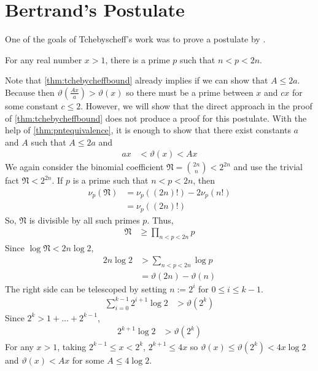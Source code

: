 \documentclass[elemannt.tex]{subfile}
\begin{document}
	\section{Bertrand's Postulate}
	One of the goals of Tchebyscheff's work was to prove a postulate by \textcite{bertrand_1845}.
		\begin{conjecture}\label{con:bertrand}
			For any real number $x>1$, there is a prime $p$ such that $n<p<2n$.
		\end{conjecture}
	Note that \autoref{thm:tchebycheffbound} already implies  if we can show that $A\leq 2a$. Because then $\vartheta\left(\frac{Ax}{a}\right)>\vartheta(x)$ so there must be a prime between $x$ and $cx$ for some constant $c\leq 2$. However, we will show that the direct approach in the proof of \autoref{thm:tchebycheffbound} does not produce a proof for this postulate.
			With the help of \autoref{thm:pntequivalence}, it is enough to show that there exist constants $a$ and $A$ such that $A\leq 2a$ and
				\begin{align*}
					ax
					& < \vartheta(x) < Ax
				\end{align*}
			We again consider the binomial coefficient $\mathfrak{N}=\binom{2n}{n}<2^{2n}$ and use the trivial fact $\mathfrak{N}<2^{2n}$. If $p$ is a prime such that $n<p<2n$, then
				\begin{align*}
					\nu_{p}(\mathfrak{N})
						& = \nu_{p}((2n)!)-2\nu_{p}(n!)\\
						& = \nu_{p}((2n)!)
				\end{align*}
			So, $\mathfrak{N}$ is divisible by all such primes $p$. Thus,
				\begin{align*}
					\mathfrak{N}
						& \geq \prod_{n<p<2n}p
				\end{align*}
			Since $\log{\mathfrak{N}}<2n\log{2}$,
				\begin{align*}
					2n\log{2}
						& > \sum_{n<p<2n}\log{p}\\
						& = \vartheta(2n)-\vartheta(n)
				\end{align*}
			The right side can be telescoped by setting $n:=2^{i}$ for $0\leq i\leq  k-1$.
				\begin{align*}
					\sum_{i=0}^{k-1}2^{i+1}\log{2}
						& > \vartheta(2^{k})
				\end{align*}
			Since $2^{k}>1+\ldots+2^{k-1}$,
				\begin{align*}
					2^{k+1}\log{2}
						& > \vartheta(2^{k})
				\end{align*}
			For any $x>1$, taking $2^{k-1}\leq x<2^{k}$, $2^{k+1}\leq 4x$ so $\vartheta(x)\leq\vartheta(2^{k})<4x\log{2}$ and $\vartheta(x)<Ax$ for some $A\leq 4\log{2}$.
\end{document}
